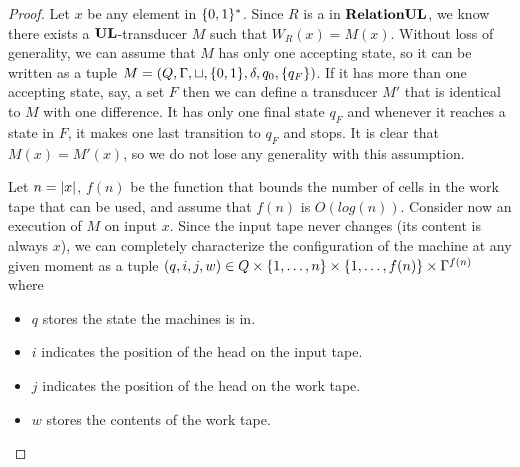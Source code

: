 \documentclass[11pt,twoside=off,numbers=noenddot]{scrbook}
\begin{document}
\begin{proof}
    Let $x$ be any element in $\{ 0, 1 \}^\ast$. Since $R$ is a in $\textbf{RelationUL}$, we know there exists a $\textbf{UL}$-transducer $M$ such that $W_R(x) = M(x)$. Without loss of generality, we can assume that $M$ has only one accepting state, so it can be written as a tuple $M = (Q, \Gamma, \sqcup, \{ 0, 1 \}, \delta, q_0, \{ q_F \})$. If it has more than one accepting state, say, a set $F$ then we can define a transducer $M'$ that is identical to $M$ with one difference. It has only one final state $q_F$ and whenever it reaches a state in $F$, it makes one last transition to $q_F$ and stops. It is clear that $M(x) = M'(x)$, so we do not lose any generality with this assumption.

    Let $n = | x |$, $f(n)$ be the function that bounds the number of cells in the work tape that can be used, and assume that $f(n)$ is $O(log(n))$. Consider now an execution of $M$ on input $x$. Since the input tape never changes (its content is always $x$), we can completely characterize the configuration of the machine at any given moment as a tuple $(q, i, j, w) \in Q \times \{ 1, \dots, n \} \times \{ 1, \dots, f(n) \} \times \Gamma^{f(n)}$ where
    \begin{itemize}
        \item $q$ stores the state the machines is in.
        \item $i$ indicates the position of the head on the input tape.
        \item $j$ indicates the position of the head on the work tape.
        \item $w$ stores the contents of the work tape.
    \end{itemize}


\end{proof}
\end{document}

